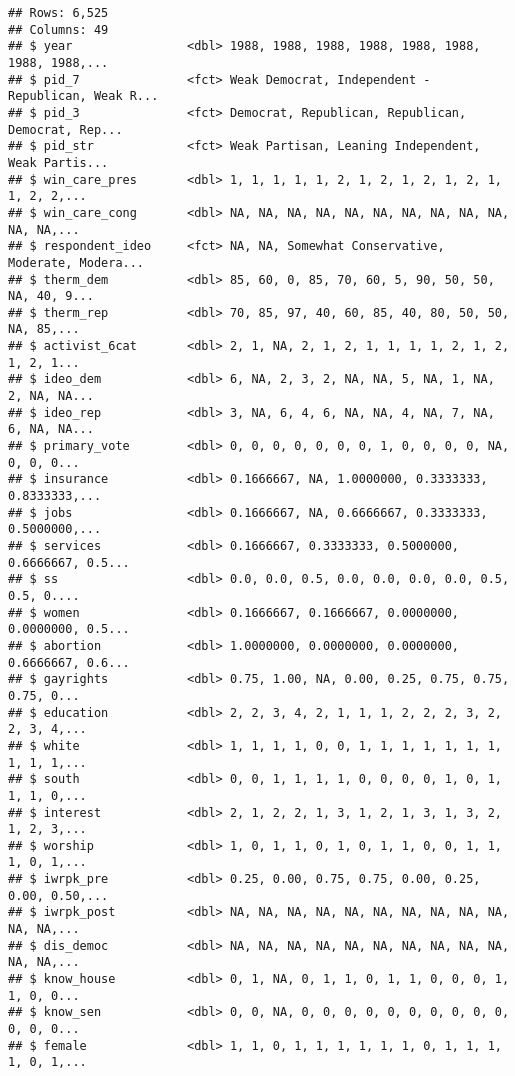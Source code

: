 \documentclass[
]{article}
\begin{document}
\begin{verbatim}
## Rows: 6,525
## Columns: 49
## $ year                <dbl> 1988, 1988, 1988, 1988, 1988, 1988, 1988, 1988,...
## $ pid_7               <fct> Weak Democrat, Independent - Republican, Weak R...
## $ pid_3               <fct> Democrat, Republican, Republican, Democrat, Rep...
## $ pid_str             <fct> Weak Partisan, Leaning Independent, Weak Partis...
## $ win_care_pres       <dbl> 1, 1, 1, 1, 1, 2, 1, 2, 1, 2, 1, 2, 1, 1, 2, 2,...
## $ win_care_cong       <dbl> NA, NA, NA, NA, NA, NA, NA, NA, NA, NA, NA, NA,...
## $ respondent_ideo     <fct> NA, NA, Somewhat Conservative, Moderate, Modera...
## $ therm_dem           <dbl> 85, 60, 0, 85, 70, 60, 5, 90, 50, 50, NA, 40, 9...
## $ therm_rep           <dbl> 70, 85, 97, 40, 60, 85, 40, 80, 50, 50, NA, 85,...
## $ activist_6cat       <dbl> 2, 1, NA, 2, 1, 2, 1, 1, 1, 1, 2, 1, 2, 1, 2, 1...
## $ ideo_dem            <dbl> 6, NA, 2, 3, 2, NA, NA, 5, NA, 1, NA, 2, NA, NA...
## $ ideo_rep            <dbl> 3, NA, 6, 4, 6, NA, NA, 4, NA, 7, NA, 6, NA, NA...
## $ primary_vote        <dbl> 0, 0, 0, 0, 0, 0, 0, 1, 0, 0, 0, 0, NA, 0, 0, 0...
## $ insurance           <dbl> 0.1666667, NA, 1.0000000, 0.3333333, 0.8333333,...
## $ jobs                <dbl> 0.1666667, NA, 0.6666667, 0.3333333, 0.5000000,...
## $ services            <dbl> 0.1666667, 0.3333333, 0.5000000, 0.6666667, 0.5...
## $ ss                  <dbl> 0.0, 0.0, 0.5, 0.0, 0.0, 0.0, 0.0, 0.5, 0.5, 0....
## $ women               <dbl> 0.1666667, 0.1666667, 0.0000000, 0.0000000, 0.5...
## $ abortion            <dbl> 1.0000000, 0.0000000, 0.0000000, 0.6666667, 0.6...
## $ gayrights           <dbl> 0.75, 1.00, NA, 0.00, 0.25, 0.75, 0.75, 0.75, 0...
## $ education           <dbl> 2, 2, 3, 4, 2, 1, 1, 1, 2, 2, 2, 3, 2, 2, 3, 4,...
## $ white               <dbl> 1, 1, 1, 1, 0, 0, 1, 1, 1, 1, 1, 1, 1, 1, 1, 1,...
## $ south               <dbl> 0, 0, 1, 1, 1, 1, 0, 0, 0, 0, 1, 0, 1, 1, 1, 0,...
## $ interest            <dbl> 2, 1, 2, 2, 1, 3, 1, 2, 1, 3, 1, 3, 2, 1, 2, 3,...
## $ worship             <dbl> 1, 0, 1, 1, 0, 1, 0, 1, 1, 0, 0, 1, 1, 1, 0, 1,...
## $ iwrpk_pre           <dbl> 0.25, 0.00, 0.75, 0.75, 0.00, 0.25, 0.00, 0.50,...
## $ iwrpk_post          <dbl> NA, NA, NA, NA, NA, NA, NA, NA, NA, NA, NA, NA,...
## $ dis_democ           <dbl> NA, NA, NA, NA, NA, NA, NA, NA, NA, NA, NA, NA,...
## $ know_house          <dbl> 0, 1, NA, 0, 1, 1, 0, 1, 1, 0, 0, 0, 1, 1, 0, 0...
## $ know_sen            <dbl> 0, 0, NA, 0, 0, 0, 0, 0, 0, 0, 0, 0, 0, 0, 0, 0...
## $ female              <dbl> 1, 1, 0, 1, 1, 1, 1, 1, 1, 0, 1, 1, 1, 1, 0, 1,...

\end{verbatim}
\end{document}
